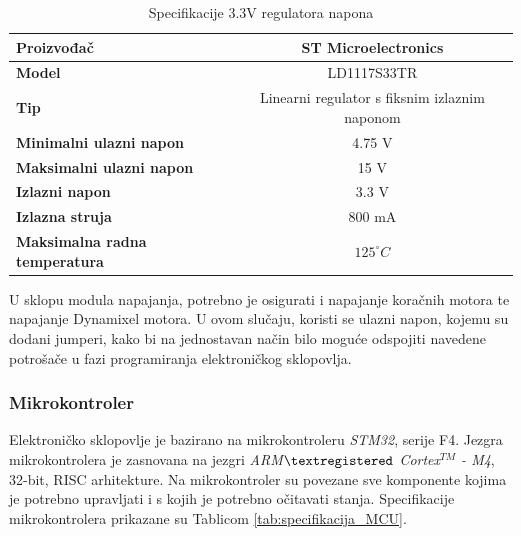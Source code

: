 \documentclass[11pt,a4paper]{article}
\begin{document}
\begin{table}[H]
	\centering
	\caption{Specifikacije 3.3V regulatora napona}
	\label{tab:specifikacija_3V3}
	\begin{tabular}{|l|c|}
		\hline
		\textbf{Proizvođač} & ST Microelectronics \\ \hline 
		\textbf{Model} &  LD1117S33TR \\ \hline 
		\textbf{Tip} &  Linearni regulator s fiksnim izlaznim naponom  \\ \hline 
		\textbf{Minimalni ulazni napon} & 4.75 V \\ \hline 
		\textbf{Maksimalni ulazni napon} & 15 V \\ \hline 
		\textbf{Izlazni napon} & 3.3 V \\ \hline 
		\textbf{Izlazna struja} & 800 mA \\ \hline 
		\textbf{Maksimalna radna temperatura} & $125 ^\circ C$ \\ \hline 
	\end{tabular}
\end{table}

U sklopu modula napajanja, potrebno je osigurati i napajanje koračnih motora te napajanje Dynamixel motora. U ovom slučaju, koristi se ulazni napon, kojemu su dodani jumperi, kako bi na jednostavan način bilo moguće odspojiti navedene potrošače u fazi programiranja elektroničkog sklopovlja.

\subsubsection{Mikrokontroler}
 Elektroničko sklopovlje je bazirano na mikrokontroleru \textit{STM32}, serije F4. Jezgra mikrokontrolera je zasnovana na jezgri \textit{ ARM$\textregistered$ Cortex$^{TM}$ - M4}, 32-bit, RISC arhitekture. Na mikrokontroler su povezane sve komponente kojima je potrebno upravljati i s kojih je potrebno očitavati stanja. Specifikacije mikrokontrolera prikazane su Tablicom \ref{tab:specifikacija_MCU}.
\end{document}
